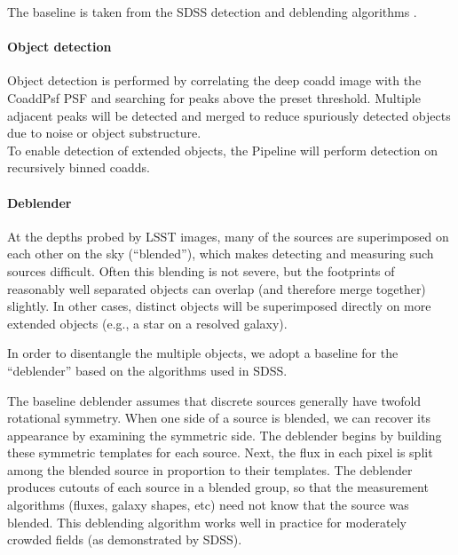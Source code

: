 \documentclass[12pt]{article}
\begin{document}
The baseline is taken from the SDSS detection and deblending algorithms
\cite{Lupton05, LuptonPhoto}.
\\

\paragraph{Object detection}

Object detection is performed by correlating the deep coadd image with the
CoaddPsf PSF and searching for peaks above the preset threshold. Multiple
adjacent peaks will be detected and merged to reduce spuriously detected
objects due to noise or object substructure.
\\

To enable detection of extended objects, the Pipeline will perform detection on recursively binned coadds.

\paragraph{Deblender}
\label{alg:deblender}

At the depths probed by LSST images, many of the sources are superimposed on each other on the sky (``blended''), which makes detecting and measuring such sources difficult.  Often this blending is not severe, but the footprints of reasonably well separated objects can overlap (and therefore merge together) slightly.  In other cases, distinct objects will be superimposed directly on more extended objects (e.g., a star on a resolved galaxy). %

In order to disentangle the multiple objects, we adopt a baseline for the ``deblender'' based on the algorithms used in SDSS.

The baseline deblender assumes that discrete sources generally have twofold
rotational symmetry.  When one side of a source is blended, we can
recover its appearance by examining the symmetric side.  The deblender
begins by building these symmetric templates for each source.  Next,
the flux in each pixel is split among the blended source in proportion
to their templates.  The deblender produces cutouts of each
source in a blended group, so that the measurement algorithms (fluxes,
galaxy shapes, etc) need not know that the source was blended. This deblending algorithm works well in practice for moderately crowded fields (as demonstrated by SDSS).
\\
\end{document}

